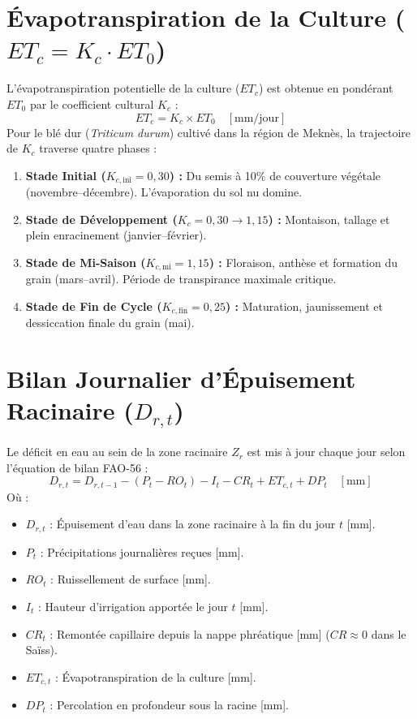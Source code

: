 \documentclass[11pt,a4paper,oneside]{report}
\begin{document}
\section{Évapotranspiration de la Culture ($ET_c = K_c \cdot ET_0$)}
L'évapotranspiration potentielle de la culture ($ET_c$) est obtenue en pondérant $ET_0$ par le coefficient cultural $K_c$ :
\begin{equation}
ET_c = K_c \times ET_0 \quad [\text{mm/jour}]
\end{equation}
Pour le blé dur (\textit{Triticum durum}) cultivé dans la région de Meknès, la trajectoire de $K_c$ traverse quatre phases :
\begin{enumerate}
    \item \textbf{Stade Initial ($K_{c,\text{ini}} = 0,30$) :} Du semis à 10\% de couverture végétale (novembre–décembre). L'évaporation du sol nu domine.
    \item \textbf{Stade de Développement ($K_{c} = 0,30 \rightarrow 1,15$) :} Montaison, tallage et plein enracinement (janvier–février).
    \item \textbf{Stade de Mi-Saison ($K_{c,\text{mi}} = 1,15$) :} Floraison, anthèse et formation du grain (mars–avril). Période de transpirance maximale critique.
    \item \textbf{Stade de Fin de Cycle ($K_{c,\text{fin}} = 0,25$) :} Maturation, jaunissement et dessiccation finale du grain (mai).
\end{enumerate}

\section{Bilan Journalier d'Épuisement Racinaire ($D_{r,t}$)}
Le déficit en eau au sein de la zone racinaire $Z_r$ est mis à jour chaque jour selon l'équation de bilan FAO-56 :
\begin{equation}
D_{r,t} = D_{r,t-1} - (P_t - RO_t) - I_t - CR_t + ET_{c,t} + DP_t \quad [\text{mm}]
\label{eq:depletion_fr}
\end{equation}
Où :
\begin{itemize}[leftmargin=*]
    \item $D_{r,t}$ : Épuisement d'eau dans la zone racinaire à la fin du jour $t$ [$\text{mm}$].
    \item $P_t$ : Précipitations journalières reçues [$\text{mm}$].
    \item $RO_t$ : Ruissellement de surface [$\text{mm}$].
    \item $I_t$ : Hauteur d'irrigation apportée le jour $t$ [$\text{mm}$].
    \item $CR_t$ : Remontée capillaire depuis la nappe phréatique [$\text{mm}$] ($CR \approx 0$ dans le Saïss).
    \item $ET_{c,t}$ : Évapotranspiration de la culture [$\text{mm}$].
    \item $DP_t$ : Percolation en profondeur sous la racine [$\text{mm}$].
\end{itemize}
\end{document}
